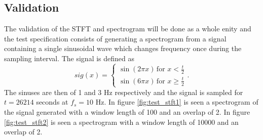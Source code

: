 \subsection{Validation}
The validation of the STFT and spectrogram will be done as a whole enity and the test specification consists of generating a spectrogram from a signal containing a single sinusoidal wave which changes frequency once during the sampling interval. The signal is defined as
\begin{equation}\label{eq:SPECTROsignal}
sig(x)=\begin{cases}\sin(2\pi x)\,\text{for }x<\frac{t}{2}\\
\sin(6\pi x)\,\text{for }x\geq\frac{t}{2}
\end{cases}.
\end{equation}
The sinuses are then of 1 and 3 Hz respectively and the signal is sampled for $t=26214$ seconds at $f_s=10$ Hz. In figure \ref{fig:test_stft1} is seen a spectrogram of the signal generated with a window length of 100 and an overlap of 2. In figure \ref{fig:test_stft2} is seen a spectrogram with a window length of 10000 and an overlap of 2.
